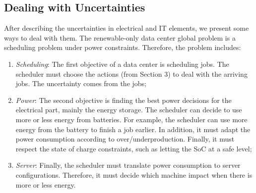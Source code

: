
\subsection{Dealing with Uncertainties}
After describing the uncertainties in electrical and IT elements, we present some ways to deal with them. The renewable-only data center global problem is a scheduling problem under power constraints. Therefore, the problem includes:
\begin{enumerate}
    \item \textit{Scheduling}: The first objective of a data center is scheduling jobs. The scheduler must choose the actions (from Section 3) to deal with the arriving jobs. The uncertainty comes from the jobs;
    \item \textit{Power}: The second objective is finding the best power decisions for the electrical part, mainly the energy storage. The scheduler can decide to use more or less energy from batteries. For example, the scheduler can use more energy from the battery to finish a job earlier. In addition, it must adapt the power consumption according to over/underproduction. Finally, it must respect the state of charge constraints, such as letting the SoC at a safe level;
    \item \textit{Server}: Finally, the scheduler must translate power consumption to server configurations. Therefore, it must decide which machine impact when there is more or less energy.
\end{enumerate}

